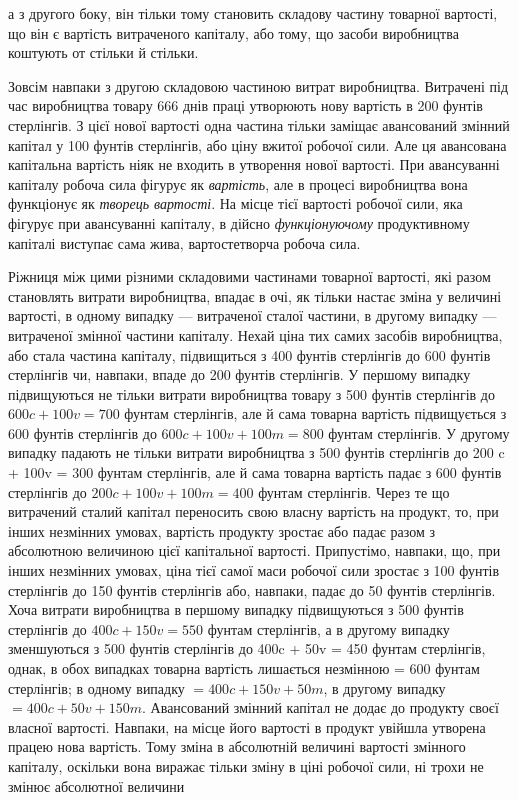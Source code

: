 \parcont{}  %
а з другого боку, він тільки тому становить складову частину
товарної вартості, що він є вартість витраченого капіталу, або
тому, що засоби виробництва коштують от стільки й стільки.

Зовсім навпаки з другою складовою частиною витрат виробництва.
Витрачені під час виробництва товару 666 днів
праці утворюють нову вартість в 200 фунтів стерлінгів. З цієї
нової вартості одна частина тільки заміщає авансований змінний
капітал у 100 фунтів стерлінгів, або ціну вжитої робочої сили.
Але ця авансована капітальна вартість ніяк не входить в утворення
нової вартості. При авансуванні капіталу робоча сила
фігурує як \emph{вартість}, але в процесі виробництва вона функціонує
як \emph{творець вартості}. На місце тієї вартості робочої сили,
яка фігурує при авансуванні капіталу, в дійсно \emph{функціонуючому}
продуктивному капіталі виступає сама жива, вартостетворча робоча
сила.

Ріжниця між цими різними складовими частинами товарної
вартості, які разом становлять витрати виробництва, впадає
в очі, як тільки настає зміна у величині вартості, в одному випадку
— витраченої сталої частини, в другому випадку — витраченої
змінної частини капіталу. Нехай ціна тих самих засобів виробництва,
або стала частина капіталу, підвищиться з 400 фунтів
стерлінгів до 600 фунтів стерлінгів чи, навпаки, впаде до
200 фунтів стерлінгів. У першому випадку підвищуються не
тільки витрати виробництва товару з 500 фунтів стерлінгів до
$600 c + 100v = 700$ фунтам стерлінгів, але й сама товарна вартість
підвищується з 600 фунтів стерлінгів до $600 c + 100 v + 100 m = 800$ фунтам стерлінгів.
У другому випадку падають не тільки витрати виробництва з 500 фунтів стерлінгів до 200 c + 100v =
300 фунтам стерлінгів, але й сама товарна вартість падає з
600 фунтів стерлінгів до $200c + 100v + 100m = 400$ фунтам стерлінгів.
Через те що витрачений сталий капітал переносить свою
власну вартість на продукт, то, при інших незмінних умовах, вартість
продукту зростає або падає разом з абсолютною величиною
цієї капітальної вартості. Припустімо, навпаки, що, при
інших незмінних умовах, ціна тієї самої маси робочої сили зростає
з 100 фунтів стерлінгів до 150 фунтів стерлінгів або,
навпаки, падає до 50 фунтів стерлінгів. Хоча витрати виробництва
в першому випадку підвищуються з 500 фунтів стерлінгів
до $400 c + 150 v = 550$ фунтам стерлінгів, а в другому випадку
зменшуються з 500 фунтів стерлінгів до 400c + 50v = 450 фунтам
стерлінгів, однак, в обох випадках товарна вартість лишається
незмінною = 600 фунтам стерлінгів; в одному випадку
$= 400c + 150v + 50 m$, в другому випадку $= 400c + 50v + 150m$.
Авансований змінний капітал не додає до продукту своєї власної
вартості. Навпаки, на місце його вартості в продукт увійшла утворена
працею нова вартість. Тому зміна в абсолютній величині
вартості змінного капіталу, оскільки вона виражає тільки зміну
в ціні робочої сили, ні трохи не змінює абсолютної величини
\parbreak{}  %
